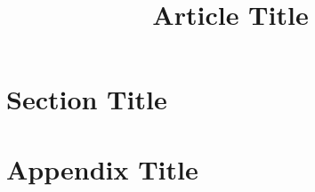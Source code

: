 \documentclass[twocolumn]{iarticle}
\title{Article Title}
\begin{document}
\begin{abstract}
  \lipsum[1]
\end{abstract}

\tableofcontents

\section{Section Title}

\lipsum[2]

\appendix

\section{Appendix Title}

\lipsum[3]
\end{document}
